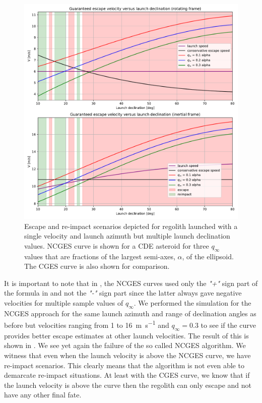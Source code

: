 \begin{figure}[htb]
\centering
\captionsetup{justification=centering}
\includegraphics[width=\textwidth, height=0.5\textheight, keepaspectratio=true]{non_conservative_escape_speed/multiple_qinfinity_plus.pdf}
\caption{Escape and re-impact scenarios depicted for regolith launched with a single velocity and launch azimuth but multiple launch declination values. \gls{NCGES} curve is shown for a \gls{CDE} asteroid for three $q_\infty$ values that are fractions of the largest semi-axes, $\alpha$, of the ellipsoid. The \gls{CGES} curve is also shown for comparison.}
\label{fig:non_conservative_escape_multiple_qinfinity_single_velocity}
\end{figure}
\FloatBarrier
It is important to note that in , the \gls{NCGES} curves used only the \emph{"+"} sign part of the formula in  and not the \emph{"-"} sign part since the latter always gave negative velocities for multiple sample values of $q_\infty$. We performed the simulation for the \gls{NCGES} approach for the same launch azimuth and range of declination angles as before but velocities ranging from 1 to \SI{16}{\metre\per\second} and $q_\infty=0.3$ to see if the curve provides better escape estimates at other launch velocities. The result of this is shown in . We see yet again the failure of the so called \gls{NCGES} algorithm. We witness that even when the launch velocity is above the \gls{NCGES} curve, we have re-impact scenarios. This clearly means that the algorithm is not even able to demarcate re-impact situations. At least with the \gls{CGES} curve, we know that if the launch velocity is above the curve then the regolith can only escape and not have any other final fate.
